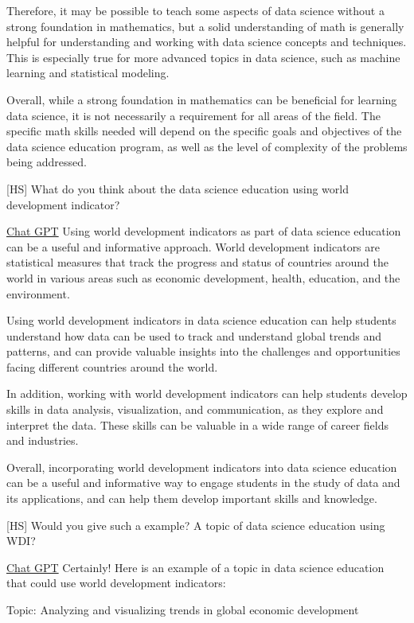 \documentclass[
]{book}
\theoremstyle{definition}
\theoremstyle{definition}
\theoremstyle{definition}
\theoremstyle{definition}
\theoremstyle{remark}
\begin{document}
Therefore, it may be possible to teach some aspects of data science without a strong foundation in mathematics, but a solid understanding of math is generally helpful for understanding and working with data science concepts and techniques. This is especially true for more advanced topics in data science, such as machine learning and statistical modeling.

Overall, while a strong foundation in mathematics can be beneficial for learning data science, it is not necessarily a requirement for all areas of the field. The specific math skills needed will depend on the specific goals and objectives of the data science education program, as well as the level of complexity of the problems being addressed.

{[}HS{]} What do you think about the data science education using world development indicator?

\protect\hyperlink{chatgpt}{Chat GPT} Using world development indicators as part of data science education can be a useful and informative approach. World development indicators are statistical measures that track the progress and status of countries around the world in various areas such as economic development, health, education, and the environment.

Using world development indicators in data science education can help students understand how data can be used to track and understand global trends and patterns, and can provide valuable insights into the challenges and opportunities facing different countries around the world.

In addition, working with world development indicators can help students develop skills in data analysis, visualization, and communication, as they explore and interpret the data. These skills can be valuable in a wide range of career fields and industries.

Overall, incorporating world development indicators into data science education can be a useful and informative way to engage students in the study of data and its applications, and can help them develop important skills and knowledge.

{[}HS{]} Would you give such a example? A topic of data science education using WDI?

\protect\hyperlink{chatgpt}{Chat GPT} Certainly! Here is an example of a topic in data science education that could use world development indicators:

Topic: Analyzing and visualizing trends in global economic development
\end{document}
